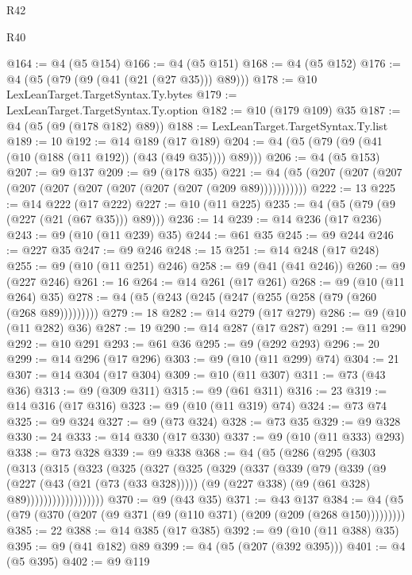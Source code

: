 \begin{lexlean}{R42}
\begin{lexlean}{R40}
\begin{coremodule}
{{{{{{{{{{{{{{{{{{{{{{{{{{{{{{{{{{{{{{{{{{{{{{{{{{{{{{{{{{{{{{{{{{{{{{{{{{{{{{{{{{{{{{{{{{{{{{{{{{{{{{{{{{{{{@164 := @4 (@5 @154)
@166 := @4 (@5 @151)
@168 := @4 (@5 @152)
@176 := @4 (@5 (@79 (@9 (@41 (@21 (@27 @35))) @89)))
@178 := @10 LexLeanTarget.TargetSyntax.Ty.bytes
@179 := LexLeanTarget.TargetSyntax.Ty.option
@182 := @10 (@179 @109) @35
@187 := @4 (@5 (@9 (@178 @182) @89))
@188 := LexLeanTarget.TargetSyntax.Ty.list
@189 := 10
@192 := @14 @189 (@17 @189)
@204 := @4 (@5 (@79 (@9 (@41 (@10 (@188 (@11 @192)) (@43 (@49 @35)))) @89)))
@206 := @4 (@5 @153)
@207 := @9 @137
@209 := @9 (@178 @35)
@221 := @4 (@5 (@207 (@207 (@207 (@207 (@207 (@207 (@207 (@207 (@207 (@209 @89)))))))))))
@222 := 13
@225 := @14 @222 (@17 @222)
@227 := @10 (@11 @225)
@235 := @4 (@5 (@79 (@9 (@227 (@21 (@67 @35))) @89)))
@236 := 14
@239 := @14 @236 (@17 @236)
@243 := @9 (@10 (@11 @239) @35)
@244 := @61 @35
@245 := @9 @244
@246 := @227 @35
@247 := @9 @246
@248 := 15
@251 := @14 @248 (@17 @248)
@255 := @9 (@10 (@11 @251) @246)
@258 := @9 (@41 (@41 @246))
@260 := @9 (@227 @246)
@261 := 16
@264 := @14 @261 (@17 @261)
@268 := @9 (@10 (@11 @264) @35)
@278 := @4 (@5 (@243 (@245 (@247 (@255 (@258 (@79 (@260 (@268 @89)))))))))
@279 := 18
@282 := @14 @279 (@17 @279)
@286 := @9 (@10 (@11 @282) @36)
@287 := 19
@290 := @14 @287 (@17 @287)
@291 := @11 @290
@292 := @10 @291
@293 := @61 @36
@295 := @9 (@292 @293)
@296 := 20
@299 := @14 @296 (@17 @296)
@303 := @9 (@10 (@11 @299) @74)
@304 := 21
@307 := @14 @304 (@17 @304)
@309 := @10 (@11 @307)
@311 := @73 (@43 @36)
@313 := @9 (@309 @311)
@315 := @9 (@61 @311)
@316 := 23
@319 := @14 @316 (@17 @316)
@323 := @9 (@10 (@11 @319) @74)
@324 := @73 @74
@325 := @9 @324
@327 := @9 (@73 @324)
@328 := @73 @35
@329 := @9 @328
@330 := 24
@333 := @14 @330 (@17 @330)
@337 := @9 (@10 (@11 @333) @293)
@338 := @73 @328
@339 := @9 @338
@368 := @4
    (@5
      (@286
        (@295
          (@303
            (@313
              (@315
                (@323
                  (@325
                    (@327
                      (@325
                        (@329
                          (@337
                            (@339
                              (@79
                                (@339
                                  (@9
                                    (@227 (@43 (@21 (@73 (@33 @328)))))
                                    (@9 (@227 @338) (@9 (@61 @328) @89))))))))))))))))))
@370 := @9 (@43 @35)
@371 := @43 @137
@384 := @4 (@5 (@79 (@370 (@207 (@9 @371 (@9 (@110 @371) (@209 (@209 (@268 @150)))))))))
@385 := 22
@388 := @14 @385 (@17 @385)
@392 := @9 (@10 (@11 @388) @35)
@395 := @9 (@41 @182) @89
@399 := @4 (@5 (@207 (@392 @395)))
@401 := @4 (@5 @395)
@402 := @9 @119
}}}}}}}}}}}}}}}}}}}}}}}}}}}}}}}}}}}}}}}}}}}}}}}}}}}}}}}}}}}}}}}}}}}}}}}}}}}}}}}}}}}}}}}}}}}}}}}}}}}}}}}}}}}}}
\end{coremodule}
\end{lexlean}
\end{lexlean}
